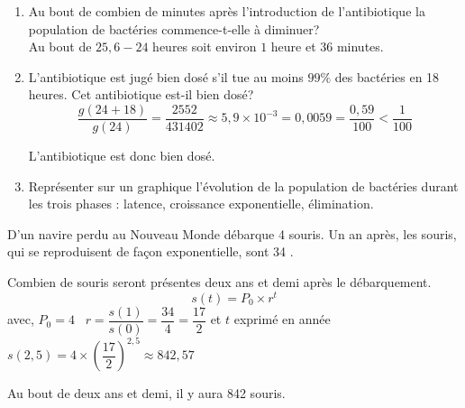 \documentclass[french]{book}
\begin{document}
\begin{corrige}
\begin{enumerate}
\begin{enumerate}
$$g'(x)>0 \Longleftrightarrow x<\dfrac{82633}{3226} \,(\approx 25,6)$$ 

Autrement dit, $g$ est strictement croissante sur $[24;25,6]$ et strictement décroissante sur $[25,6;42]$.

\item Au bout de combien de minutes après l'introduction de l'antibiotique la population de bactéries commence-t-elle à diminuer?\\

Au bout de $25,6-24$ heures soit environ $1$ heure et $36$ minutes.

\item L'antibiotique est jugé bien dosé s'il tue au moins $99 \%$ des bactéries en 18 heures. Cet antibiotique est-il bien dosé? \\

$$\dfrac{g(24+18)}{g(24)}=\dfrac{2552}{431402}\approx 5,9 \times 10^{-3}=0,0059=\dfrac{0,59}{100}<\dfrac{1}{100}$$

L'antibiotique est donc bien dosé. 

\item Représenter sur un graphique l'évolution de la population de bactéries durant les trois phases : latence, croissance exponentielle, élimination.

\end{enumerate}
\end{enumerate}
\end{corrige}

\begin{corrige}
D'un navire perdu au Nouveau Monde débarque 4 souris. Un an après, les souris, qui se reproduisent de façon exponentielle, sont 34 .

Combien de souris seront présentes deux ans et demi après le débarquement.\\

$$s(t)=P_0\times r^t$$ 
avec, 
$P_0=4 \;\;\; r=\dfrac{s(1)}{s(0)}=\dfrac{34}{4}=\dfrac{17}{2}$
et $t$ exprimé en année
$s(2,5)=4 \times (\dfrac{17}{2})^{2,5}  \approx 842,57$ 
 
Au bout de deux ans et demi, il y aura 842 souris.
\end{corrige}
\end{document}
